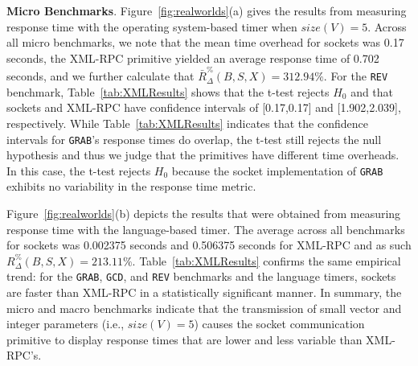 \documentclass{sig-alternate}
\begin{document}
{\bf Micro Benchmarks}. Figure~\ref{fig:realworlds}(a) gives the
results from measuring response time with the operating system-based
timer when $size(V) = 5$.  Across all micro benchmarks, we note that
the mean time overhead for sockets was 0.17 seconds, the XML-RPC
primitive yielded an average response time of 0.702 seconds, and we
further calculate that {\small $\bar{R}_\Delta^\%(B,S,X)$}$=312.94\%$.
For the \texttt{REV} benchmark, Table~\ref{tab:XMLResults} shows that
the t-test rejects $H_0$ and that sockets and XML-RPC have confidence
intervals of [0.17,0.17] and [1.902,2.039], respectively.  While
Table~\ref{tab:XMLResults} indicates that the confidence intervals for
{\tt GRAB}'s response times do overlap, the t-test still rejects the
null hypothesis and thus we judge that the primitives have different
time overheads.  In this case, the t-test rejects $H_0$ because the
socket implementation of {\tt GRAB} exhibits no variability in the
response time metric.




Figure~\ref{fig:realworlds}(b) depicts the results that were obtained
from measuring response time with the language-based timer. The
average across all benchmarks for sockets was 0.002375 seconds and
0.506375 seconds for XML-RPC and as such {\small
  $R_\Delta^\%(B,S,X)$}$=213.11\%$.  Table~\ref{tab:XMLResults}
confirms the same empirical trend: for the {\tt GRAB}, {\tt GCD}, and
{\tt REV} benchmarks and the language timers, sockets are faster than
XML-RPC in a statistically significant manner.  In summary, the micro
and macro benchmarks indicate that the transmission of small vector
and integer parameters (i.e., $size(V)=5$) causes the socket
communication primitive to display response times that are lower and
less variable than XML-RPC's.
\end{document}
